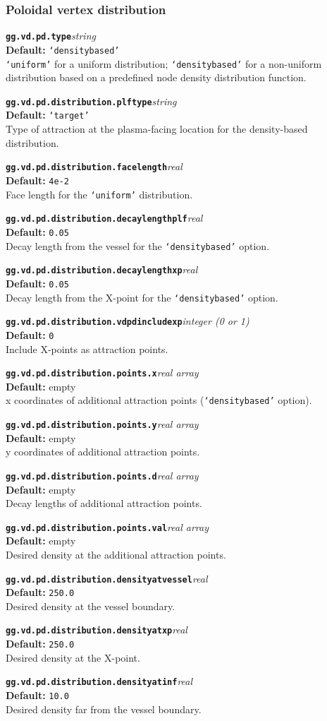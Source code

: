 \documentclass[10pt,a4paper]{article}
\newcommand{\sw}[4]{%
  \par\vspace{0.7em}%
  \begin{minipage}{\linewidth}\raggedright
    \textbf{\texttt{#1}}\hfill\textit{#2}\\[0.1em]
    \textbf{Default:} #3\\[0.1em]
    #4\par
    \vspace{0.3em}{\color{swgrey}\hrule}
  \end{minipage}\par}
\begin{document}
\subsubsection*{Poloidal vertex distribution}
\sw{gg.vd.pd.type}{string}{\texttt{`densitybased'}}{\texttt{`uniform'} for a uniform distribution; \texttt{`densitybased'} for a non-uniform distribution based on a predefined node density distribution function.}
\sw{gg.vd.pd.distribution.plftype}{string}{\texttt{`target'}}{Type of attraction at the plasma-facing location for the density-based distribution.}
\sw{gg.vd.pd.distribution.facelength}{real}{\texttt{4e-2}}{Face length for the \texttt{`uniform'} distribution.}
\sw{gg.vd.pd.distribution.decaylengthplf}{real}{\texttt{0.05}}{Decay length from the vessel for the \texttt{`densitybased'} option.}
\sw{gg.vd.pd.distribution.decaylengthxp}{real}{\texttt{0.05}}{Decay length from the X-point for the \texttt{`densitybased'} option.}
\sw{gg.vd.pd.distribution.vdpdincludexp}{integer (0 or 1)}{\texttt{0}}{Include X-points as attraction points.}
\sw{gg.vd.pd.distribution.points.x}{real array}{empty}{x coordinates of additional attraction points (\texttt{`densitybased'} option).}
\sw{gg.vd.pd.distribution.points.y}{real array}{empty}{y coordinates of additional attraction points.}
\sw{gg.vd.pd.distribution.points.d}{real array}{empty}{Decay lengths of additional attraction points.}
\sw{gg.vd.pd.distribution.points.val}{real array}{empty}{Desired density at the additional attraction points.}
\sw{gg.vd.pd.distribution.densityatvessel}{real}{\texttt{250.0}}{Desired density at the vessel boundary.}
\sw{gg.vd.pd.distribution.densityatxp}{real}{\texttt{250.0}}{Desired density at the X-point.}
\sw{gg.vd.pd.distribution.densityatinf}{real}{\texttt{10.0}}{Desired density far from the vessel boundary.}
\end{document}
